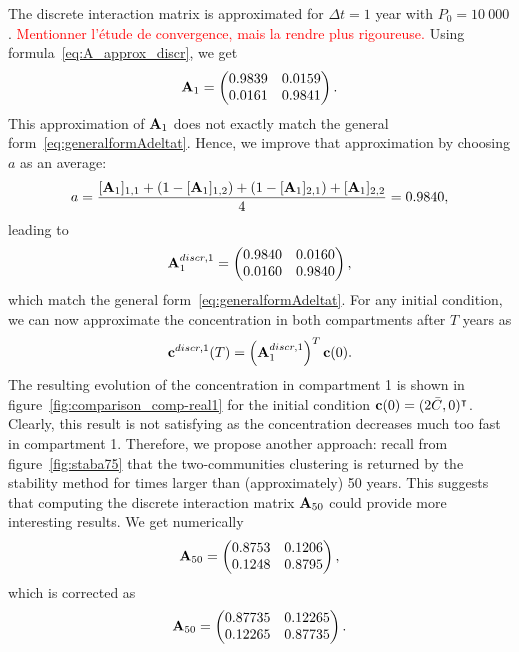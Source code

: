 The discrete interaction matrix is approximated for $\Delta t = 1$ year with $P_0 = 10\ 000$. \textcolor{red}{Mentionner l'étude de convergence, mais la rendre plus rigoureuse.} Using formula~\eqref{eq:A_approx_discr}, we get
\begin{equation}
	\mathbf A_1 = \begin{pmatrix}
		0.9839 & 0.0159 \\ 
		0.0161 & 0.9841
	\end{pmatrix}.
\end{equation}
This approximation of $\mathbf A_1$ does not exactly match the general form~\eqref{eq:generalformAdeltat}. Hence, we improve that approximation by choosing $a$ as an average:
\begin{equation}
	a = \frac{[\mathbf A_1]_{1,1} + (1-[\mathbf A_1]_{1,2}) + (1 - [\mathbf A_1]_{2,1}) + [\mathbf A_1]_{2,2}}{4} = 0.9840,
\end{equation}
leading to
\begin{equation}
	\mathbf A_1^{discr,1} = \begin{pmatrix}
		0.9840 & 0.0160 \\ 
		0.0160 & 0.9840
	\end{pmatrix},
\end{equation}
which match the general form~\eqref{eq:generalformAdeltat}. For any initial condition, we can now approximate the concentration in both compartments after $T$ years as
\begin{equation}
	\mathbf c^{discr,1}(T) = \left(\mathbf A_1^{discr,1}\right)^T \mathbf c(0).
\end{equation}
The resulting evolution of the concentration in compartment 1 is shown in figure~\ref{fig:comparison_comp-real1} for the initial condition $\mathbf c(0) = (2\bar C,0)^\intercal$. Clearly, this result is not satisfying as the concentration decreases much too fast in compartment 1. Therefore, we propose another approach: recall from figure~\ref{fig:staba75} that the two-communities clustering is returned by the stability method for times larger than (approximately) 50 years. This suggests that computing the discrete interaction matrix $\mathbf A_{50}$ could provide more interesting results. We get numerically
\begin{equation}
	\mathbf A_{50} = \begin{pmatrix}
		0.8753 &   0.1206\\
	    0.1248  &  0.8795
	\end{pmatrix},
\end{equation}
which is corrected as
\begin{equation}
	\mathbf A_{50} = \begin{pmatrix}
		0.87735 &   0.12265\\
	    0.12265  &  0.87735
	\end{pmatrix}.
\end{equation}
